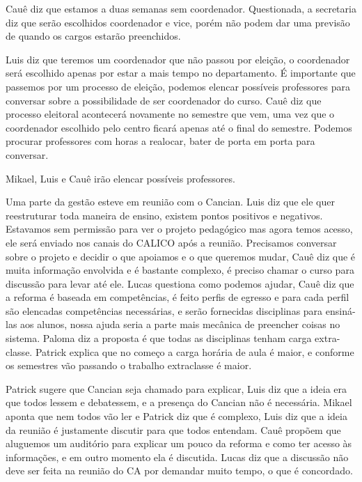 \documentclass{ata-calico}
\begin{document}
Cauê diz que estamos a duas semanas sem coordenador. Questionada, a secretaria diz que serão escolhidos coordenador e vice, porém não podem dar uma previsão de quando os cargos estarão preenchidos.

Luis diz que teremos um coordenador que não passou por eleição, o coordenador será escolhido apenas por estar a mais tempo no departamento. É importante que passemos por um processo de eleição, podemos elencar possíveis professores para conversar sobre a possibilidade de ser coordenador do curso. Cauê diz que processo eleitoral acontecerá novamente no semestre que vem, uma vez que o coordenador escolhido pelo centro ficará apenas até o final do semestre. Podemos procurar professores com horas a realocar, bater de porta em porta para conversar.

Mikael, Luis e Cauê irão elencar possíveis professores.

Uma parte da gestão esteve em reunião com o Cancian. Luis diz que ele quer reestruturar toda maneira de ensino, existem pontos positivos e negativos. Estavamos sem permissão para ver o projeto pedagógico mas agora temos acesso, ele será enviado nos canais do CALICO após a reunião. Precisamos conversar sobre o projeto e decidir o que apoiamos e o que queremos mudar, Cauê diz que é muita informação envolvida e é bastante complexo, é preciso chamar o curso para discussão para levar até ele. Lucas questiona como podemos ajudar, Cauê diz que a reforma é baseada em competências, é feito perfis de egresso e para cada perfil são elencadas competências necessárias, e serão fornecidas disciplinas para ensiná-las aos alunos, nossa ajuda seria a parte mais mecânica de preencher coisas no sistema. Paloma diz a proposta é que todas as disciplinas tenham carga extra-classe. Patrick explica que no começo a carga horária de aula é maior, e conforme os semestres vão passando o trabalho extraclasse é maior.

Patrick sugere que Cancian seja chamado para explicar, Luis diz que a ideia era que todos lessem e debatessem, e a presença do Cancian não é necessária. Mikael aponta que nem todos vão ler e Patrick diz que é complexo, Luis diz que a ideia da reunião é justamente discutir para que todos entendam. Cauê propõem que aluguemos um auditório para explicar um pouco da reforma e como ter acesso às informações, e em outro momento ela é discutida. Lucas diz que a discussão não deve ser feita na reunião do CA por demandar muito tempo, o que é concordado.
\end{document}
